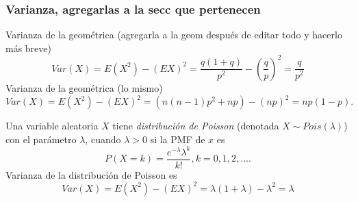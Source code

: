 \documentclass[letterpaper]{article}
\begin{document}
\subsubsection{Varianza, agregarlas a la secc que pertenecen}
Varianza de la geométrica (agregarla a la geom después de editar todo y hacerlo más breve)
\begin{equation}
Var(X)=E(X^2)-{(EX)}^2=\frac{q(1+q)}{p^2}-{(\frac{q}{p})}^2=\frac{q}{p^2}
\end{equation}
Varianza de la geométrica (lo mismo)
\begin{equation}
Var(X)=E(X^2)-{(EX)}^2=(n(n-1)p^2+np)-(np)^2=np(1-p).
\end{equation}

Una variable aleatoria $X$ tiene \emph{distribución de Poisson} (denotada $X\sim Pois(\lambda)$) con el parámetro $\lambda$, cuando $\lambda > 0$ si la PMF de $x$ es
\begin{equation}
P(X=k)=\frac{e^{-\lambda}\lambda^k}{k!}, k=0,1,2,\ldots.
\end{equation}
Varianza de la distribución de Poisson es
\begin{equation}
Var(X)=E(X^2)-{(EX)}^2=\lambda(1+\lambda)-\lambda^2=\lambda
\end{equation}
\end{document}

